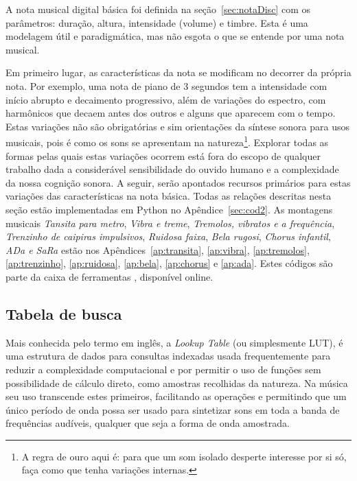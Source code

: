A nota musical digital básica foi definida na seção~\ref{sec:notaDisc} com os parâmetros:
duração, altura, intensidade (volume) e timbre. Esta é uma modelagem
útil e paradigmática, mas não esgota o que se entende por
uma nota musical.

Em primeiro lugar, as características da nota se modificam no decorrer
da própria nota.\cite{Chowning} Por exemplo, uma nota de piano
de 3 segundos tem a intensidade com início abrupto e decaimento progressivo,
além de variações do espectro, com harmônicos que
decaem antes dos outros e alguns que aparecem com o tempo.
Estas variações não são obrigatórias e sim orientações da
síntese sonora para usos musicais, pois é como os sons
se apresentam na natureza\footnote{A regra de ouro
aqui é: para que um som isolado desperte interesse
por si só, faça como que tenha variações internas.\cite{Roederer}}. 
Explorar todas as formas pelas quais estas variações ocorrem está fora
do escopo de qualquer trabalho dada a considerável sensibilidade do ouvido humano
e a complexidade da nossa cognição sonora. A seguir, serão apontados
recursos primários para estas variações das características na nota
básica.
Todas as relações descritas nesta seção estão implementadas em Python no Apêndice~\ref{sec:cod2}. As montagens musicais \emph{Tansita para metro}, \emph{Vibra e treme}, \emph{Tremolos, vibratos e a frequência}, \emph{Trenzinho de caipiras impulsivos}, \emph{Ruidosa faixa}, \emph{Bela rugosi}, \emph{Chorus infantil}, \emph{ADa e SaRa} estão nos Apêndices~\ref{ap:transita}, \ref{ap:vibra}, \ref{ap:tremolos}, \ref{ap:trenzinho}, \ref{ap:ruidosa}, \ref{ap:bela}, \ref{ap:chorus} e \ref{ap:ada}. Estes códigos são parte da caixa de ferramentas \massa, disponível online.\cite{MASSA}



\subsection{Tabela de busca}\label{subsec:lookup}

Mais conhecida pelo termo em inglês, a \emph{Lookup Table} (ou simplesmente
LUT), é uma estrutura de dados para
consultas indexadas usada
frequentemente para reduzir a complexidade computacional
e por
permitir o uso de funções sem possibilidade de cálculo direto, como
amostras recolhidas da natureza. 
Na música seu uso transcende estes
primeiros, facilitando as operações e permitindo que um único
período de onda possa ser usado para sintetizar sons em toda a banda
de frequências audíveis, qualquer que seja a forma de onda amostrada.


